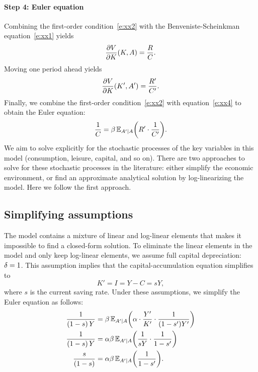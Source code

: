 \documentclass[letterpaper, 11pt, leqno]{article}
\begin{document}
\paragraph{Step 4: Euler equation} Combining the first-order condition~\eqref{e:xx2} with the Benveniste-Scheinkman equation~\eqref{e:xx1} yields
\begin{equation*}
\pd{V}{K}(K,A) = \frac{R}{C}.
\end{equation*}
Moving one period ahead yields
\begin{equation}
\pd{V}{K}(K',A') = \frac{R'}{C'}.
\label{e:xx4}\end{equation}
Finally, we combine the first-order condition~\eqref{e:xx2} with equation~\eqref{e:xx4} to obtain the Euler equation:
\begin{equation}
\frac{1}{C}=\b \E[A'\mid A]{R'\cdot\frac{1}{C'}}.
\label{e:euler}\end{equation}
We aim to solve explicitly for the stochastic processes of the key variables in this model (consumption, leisure, capital, and so on). There are two approaches to solve for these stochastic processes in the literature: either simplify the economic environment, or find an approximate analytical solution by log-linearizing the model. Here we follow the first approach.

\subsection{Simplifying assumptions}

The model contains a mixture of linear and log-linear elements that makes it impossible to find a closed-form solution. To eliminate the linear elements in the model and only keep log-linear elements, we assume full capital depreciation: $\delta=1$. This assumption implies that the capital-accumulation equation simplifies to
\begin{equation*}
K'=I=Y-C=s Y,
\end{equation*}
where $s$ is the current saving rate. Under these assumptions, we simplify the Euler equation as follows:
\begin{align*}
\frac{1}{\bp{1-s} Y}&=\b \E[A'\mid A]{\a\cdot \frac{Y'}{K'}\cdot \frac{1}{(1-s') Y'}}\\
\frac{1}{\bp{1-s} Y}&=\a \b \E[A'\mid A]{\frac{1}{s Y}\cdot \frac{1}{1-s'}} \\
\frac{s}{\bp{1-s} } & =\a \b \E[A'\mid A]{\frac{1}{1-s'}}.
\end{align*}
\end{document}
